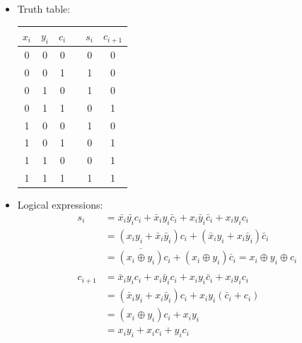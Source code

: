 \documentclass[12pt,openany, tikz,border=10pt]{book}
\newcommand*\xor{\oplus}
\begin{document}
\begin{itemize}
  \item[] Truth table:
  \begin{center}
    \begin{tabular}{cccc|cc}
      \( x_i \) & \( y_i \) & \( c_i \) & & \( s_i \) & \( c_{i+1} \) \\
      \hline
      0 & 0 & 0 & & 0 & 0 \\
      0 & 0 & 1 & & 1 & 0 \\
      0 & 1 & 0 & & 1 & 0 \\
      0 & 1 & 1 & & 0 & 1 \\
      1 & 0 & 0 & & 1 & 0 \\
      1 & 0 & 1 & & 0 & 1 \\
      1 & 1 & 0 & & 0 & 1 \\
      1 & 1 & 1 & & 1 & 1 \\
    \end{tabular}
  \end{center}
  \item[] Logical expressions:
  \begin{align*}
    s_i &= \bar{x_i}\bar{y_i} c_i + \bar{x}_i y_i \bar{c}_i + x_i \bar{y}_i \bar{c}_i + x_i y_i c_i \\
    &= (x_i y_i + \bar{x}_i \bar{y}_i)c_i + (\bar{x}_i y_i + x_i \bar{y}_i)\bar{c}_i \\
    &= \overline{(x_i \xor y_i)}c_i + (x_i \xor y_i)\bar{c}_i = x_i \xor y_i \xor c_i \\
    \\
    c_{i+1} &= \bar{x}_i y_i c_i + x_i \bar{y}_i c_i + x_i y_i \bar{c}_i + x_i y_i c_i \\
    &= (\bar{x}_i y_i + x_i \bar{y}_i)c_i + x_i y_i(\bar{c}_i + c_i) \\
    &= (x_i \xor y_i)c_i + x_i y_i \\
    &= x_i y_i + x_i c_i + y_i c_i \\
    \end{align*}

 
\end{itemize}
\end{document}
